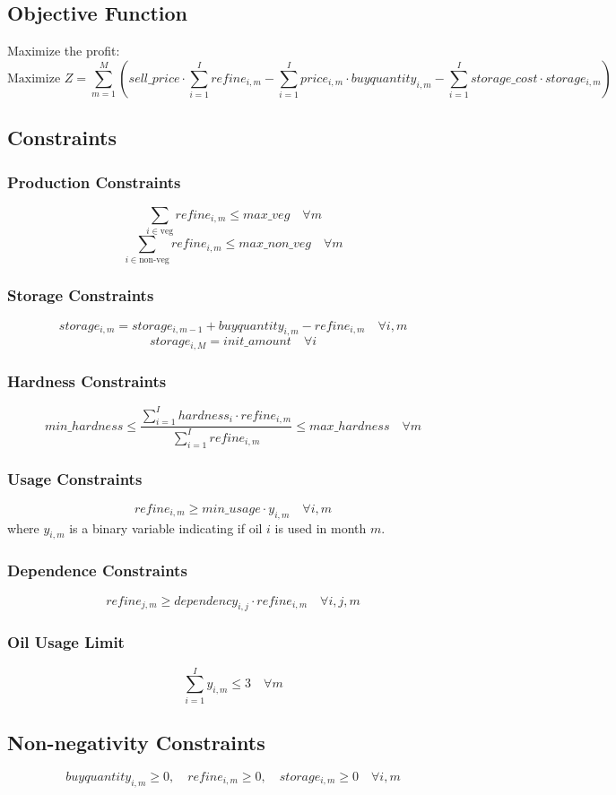 \documentclass{article}
\begin{document}
\subsection*{Objective Function}
Maximize the profit:
\[
\text{Maximize } Z = \sum_{m=1}^{M} \left( sell\_price \cdot \sum_{i=1}^{I} refine_{i,m} - \sum_{i=1}^{I} price_{i,m} \cdot buyquantity_{i,m} - \sum_{i=1}^{I} storage\_cost \cdot storage_{i,m} \right)
\]

\subsection*{Constraints}

\subsubsection*{Production Constraints}
\[
\sum_{i \in \text{veg}} refine_{i,m} \leq max\_veg \quad \forall m
\]
\[
\sum_{i \in \text{non-veg}} refine_{i,m} \leq max\_non\_veg \quad \forall m
\]

\subsubsection*{Storage Constraints}
\[
storage_{i,m} = storage_{i,m-1} + buyquantity_{i,m} - refine_{i,m} \quad \forall i, m
\]
\[
storage_{i,M} = init\_amount \quad \forall i
\]

\subsubsection*{Hardness Constraints}
\[
min\_hardness \leq \frac{\sum_{i=1}^{I} hardness_i \cdot refine_{i,m}}{\sum_{i=1}^{I} refine_{i,m}} \leq max\_hardness \quad \forall m
\]

\subsubsection*{Usage Constraints}
\[
refine_{i,m} \geq min\_usage \cdot y_{i,m} \quad \forall i, m
\]
where $y_{i,m}$ is a binary variable indicating if oil $i$ is used in month $m$.

\subsubsection*{Dependence Constraints}
\[
refine_{j,m} \geq dependency_{i,j} \cdot refine_{i,m} \quad \forall i, j, m
\]

\subsubsection*{Oil Usage Limit}
\[
\sum_{i=1}^{I} y_{i,m} \leq 3 \quad \forall m
\]

\subsection*{Non-negativity Constraints}
\[
buyquantity_{i,m} \geq 0, \quad refine_{i,m} \geq 0, \quad storage_{i,m} \geq 0 \quad \forall i, m
\]
\end{document}
